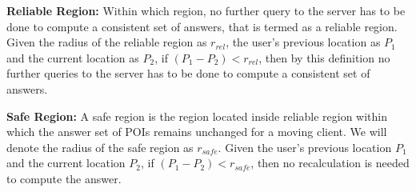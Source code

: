 \documentclass{sig-alternate}
\begin{document}
\begin{defn}
\textbf{Reliable Region:} Within which region, no further query to the server has to be done to compute a consistent set of answers, that is termed as a reliable region. Given the radius of the reliable region as $r_{rel}$, the user's previous location as $P_1$ and the current location as $P_2$, if $(P_1 - P_2) < r_{rel}$, then by this definition no further queries to the server has to be done to compute a consistent set of answers.
\end{defn}

\begin{defn} \label{safe_region}
\textbf{Safe Region:} A safe region is the region located inside reliable region within which the answer set of POIs remains unchanged for a moving client. We will denote the radius of the safe region as $r_{safe}$. Given the user's previous location $P_1$ and the current location $P_2$, if $(P_1 - P_2) < r_{safe}$, then no recalculation is needed to compute the answer.
\end{defn}
\end{document}
